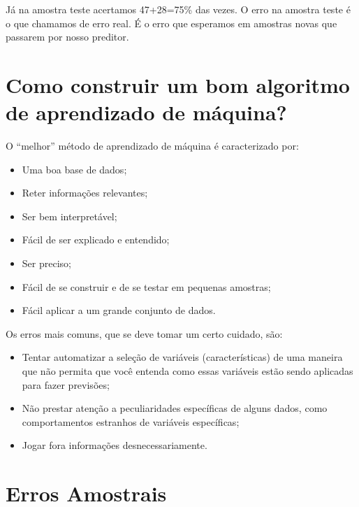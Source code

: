 \documentclass[
  letterpaper,
  DIV=11,
  numbers=noendperiod]{scrreprt}
\begin{document}
Já na amostra teste acertamos 47+28=75\% das vezes. O erro na amostra
teste é o que chamamos de erro real. É o erro que esperamos em amostras
novas que passarem por nosso preditor.


\hypertarget{como-construir-um-bom-algoritmo-de-aprendizado-de-muxe1quina}{%
\chapter{Como construir um bom algoritmo de aprendizado de
máquina?}\label{como-construir-um-bom-algoritmo-de-aprendizado-de-muxe1quina}}

O ``melhor'' método de aprendizado de máquina é caracterizado por:

\begin{itemize}
\item
  Uma boa base de dados;
\item
  Reter informações relevantes;
\item
  Ser bem interpretável;
\item
  Fácil de ser explicado e entendido;
\item
  Ser preciso;
\item
  Fácil de se construir e de se testar em pequenas amostras;
\item
  Fácil aplicar a um grande conjunto de dados.
\end{itemize}

Os erros mais comuns, que se deve tomar um certo cuidado, são:

\begin{itemize}
\item
  Tentar automatizar a seleção de variáveis (características) de uma
  maneira que não permita que você entenda como essas variáveis estão
  sendo aplicadas para fazer previsões;
\item
  Não prestar atenção a peculiaridades específicas de alguns dados, como
  comportamentos estranhos de variáveis específicas;
\item
  Jogar fora informações desnecessariamente.
\end{itemize}


\hypertarget{erros-amostrais}{%
\chapter{Erros Amostrais}\label{erros-amostrais}}
\end{document}
